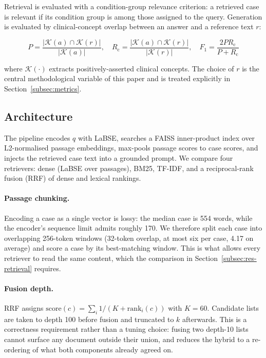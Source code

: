 \documentclass[pdflatex,sn-mathphys-num]{sn-jnl}
\theoremstyle{thmstyleone}
\theoremstyle{thmstyletwo}
\theoremstyle{thmstylethree}
\begin{document}
Retrieval is evaluated with a condition-group relevance criterion: a retrieved case is
relevant if its condition group is among those assigned to the query. Generation is
evaluated by clinical-concept overlap between an answer and a reference text $r$:

\begin{equation}\label{eq:prf}
P = \frac{|\mathcal{K}(a) \cap \mathcal{K}(r)|}{|\mathcal{K}(a)|},\quad
R_{\mathrm{c}} = \frac{|\mathcal{K}(a) \cap \mathcal{K}(r)|}{|\mathcal{K}(r)|},\quad
F_1 = \frac{2 P R_{\mathrm{c}}}{P + R_{\mathrm{c}}}
\end{equation}

where $\mathcal{K}(\cdot)$ extracts positively-asserted clinical concepts. The choice of
$r$ is the central methodological variable of this paper and is treated explicitly in
Section~\ref{subsec:metrics}.

\subsection{Architecture}\label{subsec:architecture}

The pipeline encodes $q$ with LaBSE, searches a FAISS inner-product index over
L2-normalised passage embeddings, max-pools passage scores to case scores, and injects
the retrieved case text into a grounded prompt. We compare four retrievers: dense
(LaBSE over passages), BM25, TF-IDF, and a reciprocal-rank fusion (RRF) of dense and
lexical rankings.

\paragraph{Passage chunking.} Encoding a case as a single vector is lossy: the median
case is 554 words, while the encoder's sequence limit admits roughly 170. We therefore
split each case into overlapping 256-token windows (32-token overlap, at most six per
case, 4.17 on average) and score a case by its best-matching window. This is what allows
every retriever to read the same content, which the comparison in
Section~\ref{subsec:res-retrieval} requires.

\paragraph{Fusion depth.} RRF assigns $\mathrm{score}(c) = \sum_i 1/(K + \mathrm{rank}_i(c))$
with $K = 60$. Candidate lists are taken to depth 100 before fusion and truncated to
$k$ afterwards. This is a correctness requirement rather than a tuning choice: fusing two
depth-10 lists cannot surface any document outside their union, and reduces the hybrid to
a re-ordering of what both components already agreed on.
\end{document}
